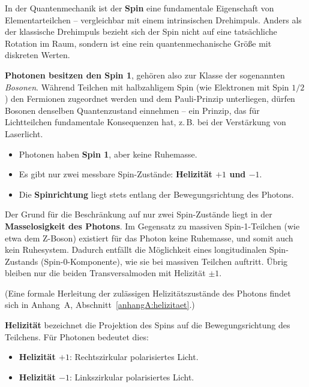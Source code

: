 In der Quantenmechanik ist der \textbf{Spin} eine fundamentale Eigenschaft von Elementarteilchen – vergleichbar mit einem intrinsischen Drehimpuls. Anders als der klassische Drehimpuls bezieht sich der Spin nicht auf eine tatsächliche Rotation im Raum, sondern ist eine rein quantenmechanische Größe mit diskreten Werten.

\vspace{0.5em}
\textbf{Photonen besitzen den Spin 1}, gehören also zur Klasse der sogenannten \textit{Bosonen}. Während Teilchen mit halbzahligem Spin (wie Elektronen mit Spin $1/2$) den Fermionen zugeordnet werden und dem Pauli-Prinzip unterliegen, dürfen Bosonen denselben Quantenzustand einnehmen – ein Prinzip, das für Lichtteilchen fundamentale Konsequenzen hat, z.\,B. bei der Verstärkung von Laserlicht.
\vspace{1em}
\begin{tcolorbox}[physikbox, title=Eigenschaften des Photon-Spins]
	\label{box:Eigenschaften des}
	\begin{itemize}
		\item Photonen haben \textbf{Spin 1}, aber keine Ruhemasse.
		\item Es gibt nur zwei messbare Spin-Zustände: \textbf{Helizität $+1$ und $-1$}.
		\item Die \textbf{Spinrichtung} liegt stets entlang der Bewegungsrichtung des Photons.
	\end{itemize}
\end{tcolorbox}
\vspace{1em}
Der Grund für die Beschränkung auf nur zwei Spin-Zustände liegt in der \textbf{Masselosigkeit des Photons}. Im Gegensatz zu massiven Spin-1-Teilchen (wie etwa dem Z-Boson) existiert für das Photon keine Ruhemasse, und somit auch kein Ruhesystem. Dadurch entfällt die Möglichkeit eines longitudinalen Spin-Zustands (Spin-0-Komponente), wie sie bei massiven Teilchen auftritt. Übrig bleiben nur die beiden Transversalmoden mit Helizität $\pm1$.

(Eine formale Herleitung der zulässigen Helizitätszustände des Photons findet sich in Anhang~A, Abschnitt~\ref{anhangA:helizitaet}.)

\newpage
\noindent
\textbf{Helizität} bezeichnet die Projektion des Spins auf die Bewegungsrichtung des Teilchens. Für Photonen bedeutet dies:
\begin{itemize}
	\item \textbf{Helizität $+1$}: Rechtszirkular polarisiertes Licht.
	\item \textbf{Helizität $-1$}: Linkszirkular polarisiertes Licht.
\end{itemize}


